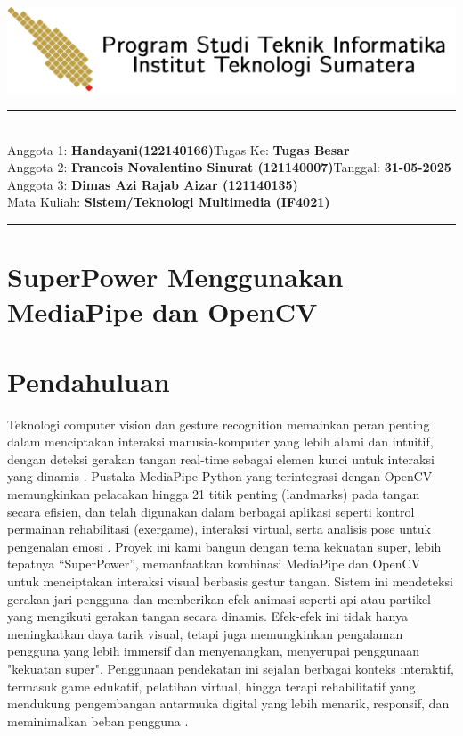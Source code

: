 \documentclass[11pt,a4paper]{article}
\newcommand{\studentA}{\textbf{Handayani(122140166)}}
\newcommand{\studentB}{\textbf{Francois Novalentino Sinurat (121140007)}}
\newcommand{\studentC}{\textbf{⁠Dimas Azi Rajab Aizar (121140135)}}
\newcommand{\course}{\textbf{Sistem/Teknologi Multimedia (IF4021)}}
\newcommand{\assignment}{\textbf{Tugas Besar}}
\newcommand{\tanggal}{\textbf{31-05-2025}}
\begin{document}
\thispagestyle{empty}
\begin{center}
	\includegraphics[scale = 0.15]{Figure/ifitera-header.png}
	\vspace{0.1cm}
\end{center}
\noindent
\rule{17cm}{0.2cm}\\[0.3cm]
Anggota 1: \studentA \hfill Tugas Ke: \assignment\\[0.1cm]
Anggota 2: \studentB \hfill Tanggal: \tanggal\\[0.1cm]
Anggota 3: \studentC \\[0.1cm]
Mata Kuliah: \course \\[0.1cm]
\rule{17cm}{0.05cm}
\vspace{0.1cm}



\section*{SuperPower Menggunakan MediaPipe dan OpenCV}


\section{Pendahuluan}
Teknologi computer vision dan gesture recognition memainkan peran penting dalam menciptakan interaksi manusia-komputer yang lebih alami dan intuitif, dengan deteksi gerakan tangan real-time sebagai elemen kunci untuk interaksi yang dinamis 
 \cite{martinez2025improved}. Pustaka MediaPipe Python yang terintegrasi dengan OpenCV memungkinkan pelacakan hingga 21 titik penting (landmarks) pada tangan secara efisien, dan telah digunakan dalam berbagai aplikasi seperti kontrol permainan rehabilitasi (exergame), interaksi virtual, serta analisis pose untuk pengenalan emosi \cite{husna2025investigation}. Proyek ini kami bangun dengan tema kekuatan super, lebih tepatnya “SuperPower”, memanfaatkan kombinasi MediaPipe dan OpenCV untuk menciptakan interaksi visual berbasis gestur tangan. Sistem ini mendeteksi gerakan jari pengguna dan memberikan efek animasi seperti api atau partikel yang mengikuti gerakan tangan secara dinamis. Efek-efek ini tidak hanya meningkatkan daya tarik visual, tetapi juga memungkinkan pengalaman pengguna yang lebih immersif dan menyenangkan, menyerupai penggunaan "kekuatan super". Penggunaan pendekatan ini sejalan berbagai konteks interaktif, termasuk game edukatif, pelatihan virtual, hingga terapi rehabilitatif yang mendukung pengembangan antarmuka digital yang lebih menarik, responsif, dan meminimalkan beban pengguna \cite{nuralin2024realtime}.
    
\end{document}
